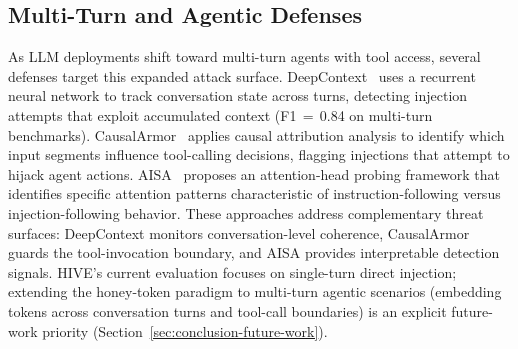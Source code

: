 \documentclass[manuscript,screen,review]{acmart}
\begin{document}
\subsection{Multi-Turn and Agentic Defenses}
As LLM deployments shift toward multi-turn agents with tool access, several defenses target this expanded attack surface. DeepContext~\cite{deepcontext2024} uses a recurrent neural network to track conversation state across turns, detecting injection attempts that exploit accumulated context (F1\,$=$\,0.84 on multi-turn benchmarks). CausalArmor~\cite{causalarmor2024} applies causal attribution analysis to identify which input segments influence tool-calling decisions, flagging injections that attempt to hijack agent actions. AISA~\cite{aisa2024} proposes an attention-head probing framework that identifies specific attention patterns characteristic of instruction-following versus injection-following behavior. These approaches address complementary threat surfaces: DeepContext monitors conversation-level coherence, CausalArmor guards the tool-invocation boundary, and AISA provides interpretable detection signals. HIVE's current evaluation focuses on single-turn direct injection; extending the honey-token paradigm to multi-turn agentic scenarios (embedding tokens across conversation turns and tool-call boundaries) is an explicit future-work priority (Section~\ref{sec:conclusion-future-work}).
\end{document}
